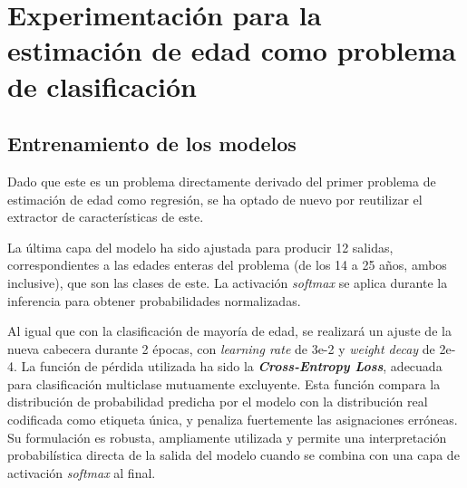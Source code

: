 \FloatBarrier



\section{Experimentación para la estimación de edad como problema de clasificación}


\subsection{Entrenamiento de los modelos}

Dado que este es un problema directamente derivado del primer problema de estimación de edad como regresión, se ha optado de nuevo por reutilizar el extractor de características de este. 

La última capa del modelo ha sido ajustada para producir 12 salidas, correspondientes a las edades enteras del problema (de los 14 a 25 años, ambos inclusive), que son las clases de este. La activación \textit{softmax} se aplica durante la inferencia para obtener probabilidades normalizadas.

Al igual que con la clasificación de mayoría de edad, se realizará un ajuste de la nueva cabecera durante 2 épocas, con \textit{learning rate} de 3e-2 y \textit{weight decay} de 2e-4. La función de pérdida utilizada ha sido la \textbf{\textit{Cross-Entropy Loss}}, adecuada para clasificación multiclase mutuamente excluyente. Esta función compara la distribución de probabilidad predicha por el modelo con la distribución real codificada como etiqueta única, y penaliza fuertemente las asignaciones erróneas. Su formulación es robusta, ampliamente utilizada y permite una interpretación probabilística directa de la salida del modelo cuando se combina con una capa de activación \textit{softmax} al final.


